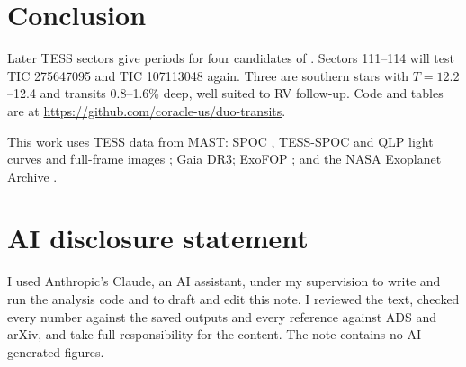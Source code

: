 \documentclass{aastex701}
\begin{document}
\section{Conclusion}

Later TESS sectors give periods for four candidates of \citet{Salinas2026}. Sectors 111--114
will test TIC 275647095 and TIC 107113048 again. Three are
southern stars with $T=12.2$--12.4 and transits 0.8--1.6\% deep, well suited to RV follow-up.
Code and tables are at \url{https://github.com/coracle-us/duo-transits}.

\begin{acknowledgments}
This work uses TESS data from MAST: SPOC ,
TESS-SPOC  and QLP
 light curves and
full-frame images ; Gaia DR3;
ExoFOP ; and the NASA Exoplanet
Archive .
\end{acknowledgments}


\section*{AI disclosure statement}
I used Anthropic's Claude, an AI assistant, under my supervision to write and run the analysis code
and to draft and edit this note. I reviewed the text, checked every number against the saved
outputs and every reference against ADS and arXiv, and take full responsibility for the content.
The note contains no AI-generated figures.
\end{document}
